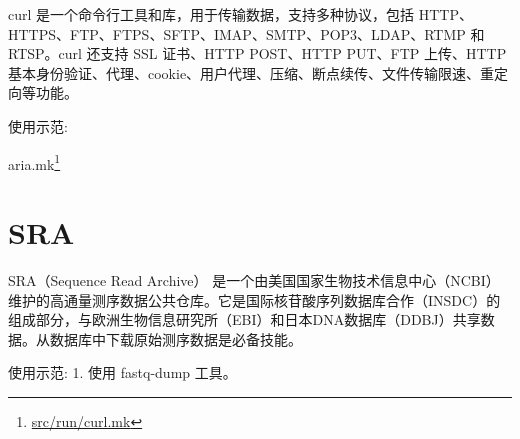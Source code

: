 \documentclass[]{ctexbook}
\newenvironment{Shaded}{\begin{snugshade}}{\end{snugshade}}
\newcommand{\AttributeTok}[1]{\textcolor[rgb]{0.13,0.29,0.53}{#1}}
\newcommand{\DataTypeTok}[1]{\textcolor[rgb]{0.13,0.29,0.53}{#1}}
\newcommand{\ExtensionTok}[1]{#1}
\newcommand{\FunctionTok}[1]{\textcolor[rgb]{0.13,0.29,0.53}{\textbf{#1}}}
\newcommand{\KeywordTok}[1]{\textcolor[rgb]{0.13,0.29,0.53}{\textbf{#1}}}
\newcommand{\NormalTok}[1]{#1}
\newcommand{\OperatorTok}[1]{\textcolor[rgb]{0.81,0.36,0.00}{\textbf{#1}}}
\newcommand{\VariableTok}[1]{\textcolor[rgb]{0.00,0.00,0.00}{#1}}
\renewcommand{\href}[2]{#2\footnote{\url{#1}}}
\begin{document}
curl 是一个命令行工具和库，用于传输数据，支持多种协议，包括 HTTP、HTTPS、FTP、FTPS、SFTP、IMAP、SMTP、POP3、LDAP、RTMP 和 RTSP。curl 还支持 SSL 证书、HTTP POST、HTTP PUT、FTP 上传、HTTP 基本身份验证、代理、cookie、用户代理、压缩、断点续传、文件传输限速、重定向等功能。

使用示范:

\begin{Shaded}
\end{Shaded}

\href{src/run/curl.mk}{aria.mk}

\chapter{SRA}\label{sra}

SRA（Sequence Read Archive） 是一个由美国国家生物技术信息中心（NCBI）维护的高通量测序数据公共仓库。它是国际核苷酸序列数据库合作（INSDC）的组成部分，与欧洲生物信息研究所（EBI）和日本DNA数据库（DDBJ）共享数据。从数据库中下载原始测序数据是必备技能。

使用示范:
1. 使用 fastq-dump 工具。

\begin{Shaded}
\end{Shaded}

\begin{Shaded}
\end{Shaded}
\end{document}

